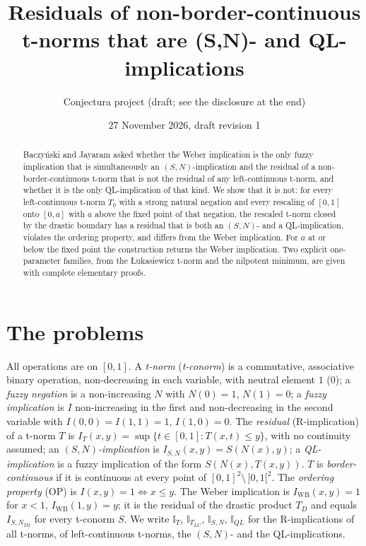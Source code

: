\documentclass[11pt]{amsart}
\title[A second (S,N)- and QL-residual of a non-left-continuous t-norm]{Residuals of non-border-continuous t-norms that are (S,N)- and QL-implications}
\author{Conjectura project (draft; see the disclosure at the end)}
\date{27 November 2026, draft revision 1}
\theoremstyle{remark}
\newcommand{\IWB}{I_{\mathrm{WB}}}
\newcommand{\cI}{\mathbb{I}}
\begin{document}
\begin{abstract}
Baczy\'nski and Jayaram asked whether the Weber implication is the only fuzzy
implication that is simultaneously an $(S,N)$-implication and the residual of a
non-border-continuous t-norm that is not the residual of any left-continuous
t-norm, and whether it is the only QL-implication of that kind. We show that
it is not: for every left-continuous t-norm $T_0$ with a strong natural
negation and every rescaling of $[0,1]$ onto $[0,a]$ with $a$ above the fixed
point of that negation, the rescaled t-norm closed by the drastic boundary has a
residual that is both an $(S,N)$- and a QL-implication, violates the ordering
property, and differs from the Weber implication. For $a$ at or below the fixed
point the construction returns the Weber implication. Two explicit
one-parameter families, from the {\L}ukasiewicz t-norm and the nilpotent
minimum, are given with complete elementary proofs.
\end{abstract}

\maketitle

\section{The problems}

All operations are on $[0,1]$. A \emph{t-norm} (\emph{t-conorm}) is a
commutative, associative binary operation, non-decreasing in each variable,
with neutral element $1$ ($0$); a \emph{fuzzy negation} is a non-increasing
$N$ with $N(0)=1$, $N(1)=0$; a \emph{fuzzy implication} is $I$ non-increasing in
the first and non-decreasing in the second variable with $I(0,0)=I(1,1)=1$,
$I(1,0)=0$. The \emph{residual} (R-implication) of a t-norm $T$ is
$I_T(x,y)=\sup\{t\in[0,1] : T(x,t)\le y\}$, with no continuity assumed; an
\emph{$(S,N)$-implication} is $I_{S,N}(x,y)=S(N(x),y)$; a \emph{QL-implication}
is a fuzzy implication of the form $S(N(x),T(x,y))$. $T$ is
\emph{border-continuous} if it is continuous at every point of
$[0,1]^2\setminus\,]0,1[^2$. The \emph{ordering property} (OP) is
$I(x,y)=1\iff x\le y$. The Weber implication is $\IWB(x,y)=1$ for $x<1$,
$\IWB(1,y)=y$; it is the residual of the drastic product $T_D$ and equals
$I_{S,N_{D2}}$ for every t-conorm $S$. We write $\cI_T$, $\cI_{T_{LC}}$,
$\cI_{S,N}$, $\cI_{QL}$ for the R-implications of all t-norms, of
left-continuous t-norms, the $(S,N)$- and the QL-implications.
\end{document}
